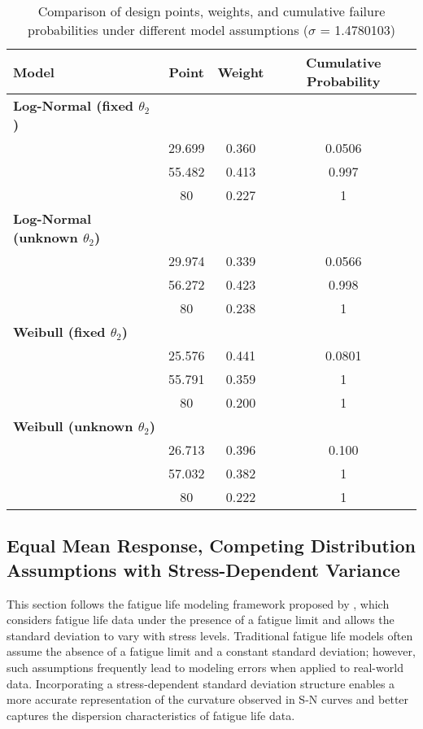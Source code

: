 \begin{table}[H] \scriptsize
\caption{Comparison of design points, weights, and cumulative failure probabilities under different model assumptions ($\sigma$ = 1.4780103)}
\label{tab:design_comparison1.48}
\centering
\renewcommand{\arraystretch}{1.44}
\begin{tabular}{lccc}
\toprule
\textbf{Model} & \textbf{Point} & \textbf{Weight} & \textbf{Cumulative Probability} \\
\midrule
\textbf{Log-Normal (fixed $\theta_2$)} & & & \\
\quad & 29.699 & 0.360 & 0.0506 \\
\quad & 55.482 & 0.413 & 0.997 \\
\quad & 80 & 0.227 & 1 \\
\addlinespace
\textbf{Log-Normal (unknown $\theta_2$)} & & & \\
\quad & 29.974 & 0.339 & 0.0566 \\
\quad & 56.272 & 0.423 & 0.998 \\
\quad & 80 & 0.238 & 1 \\
\addlinespace
\textbf{Weibull (fixed $\theta_2$)} & & & \\
\quad & 25.576 & 0.441 & 0.0801 \\
\quad & 55.791 & 0.359 & 1 \\
\quad & 80 & 0.200 & 1 \\
\addlinespace
\textbf{Weibull (unknown $\theta_2$)} & & & \\
\quad & 26.713 & 0.396 & 0.100 \\
\quad & 57.032 & 0.382 & 1 \\
\quad & 80 & 0.222 & 1 \\
\bottomrule
\end{tabular}
\end{table}

\newpage

\subsection{Equal Mean Response, Competing Distribution Assumptions with Stress-Dependent Variance}\label{SEC:Meeker}

\hspace*{8mm} This section follows the fatigue life modeling framework proposed by \cite{pascual1997analysis}, which considers fatigue life data under the presence of a fatigue limit and allows the standard deviation to vary with stress levels. Traditional fatigue life models often assume the absence of a fatigue limit and a constant standard deviation; however, such assumptions frequently lead to modeling errors when applied to real-world data. Incorporating a stress-dependent standard deviation structure enables a more accurate representation of the curvature observed in S-N curves and better captures the dispersion characteristics of fatigue life data.

